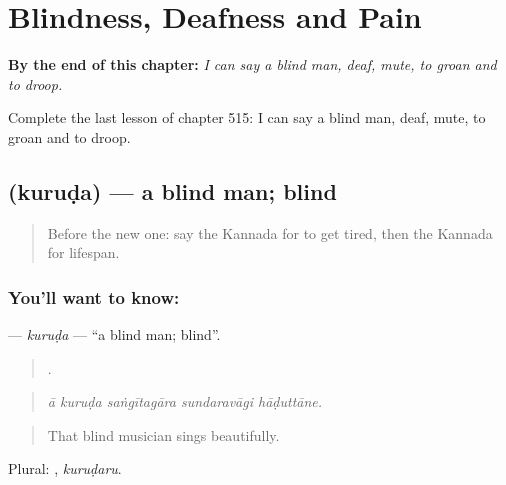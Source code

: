 
\chapter{Blindness, Deafness and Pain}
\label{ch:ka-blindness-deafness-and-pain}

\begin{chapteropening}
\textbf{By the end of this chapter:} \emph{I can say a blind man, deaf, mute, to groan and to droop.}

Complete the last lesson of chapter 515: I can say a blind man, deaf, mute, to groan and to droop.
\end{chapteropening}

\section[\texorpdfstring{\kn{ಕುರುಡ} (kuruḍa)}{ಕುರುಡ (kuruḍa)}]{ (kuruḍa) — a blind man; blind}

\label{lesson:KA-C515-kuruda}



\begin{quote}
Before the new one: say the Kannada for to get tired, then the Kannada for lifespan.
\end{quote}

\subsection*{You'll want to know: }
\textbf{} — \emph{kuruḍa} — \textquotedblleft{}a blind man; blind\textquotedblright{}.

\begin{quote}
    .
\end{quote}

\begin{quote}
\emph{ā kuruḍa saṅgītagāra sundaravāgi hāḍuttāne.}
\end{quote}

\begin{quote}
That blind musician sings beautifully.
\end{quote}

Plural: , \emph{kuruḍaru}.

